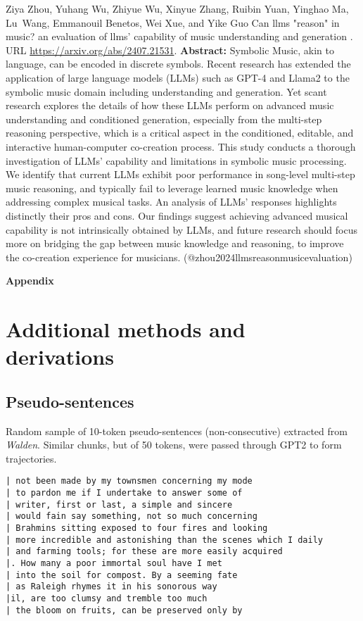 \documentclass{article} %
\begin{document}
\begin{thebibliography}{}
 Ziya Zhou, Yuhang Wu, Zhiyue Wu, Xinyue Zhang, Ruibin Yuan, Yinghao Ma, Lu~Wang, Emmanouil Benetos, Wei Xue, and Yike Guo \newblock Can llms "reason" in music? an evaluation of llms' capability of music understanding and generation . \newblock URL \url{https://arxiv.org/abs/2407.21531}. \newblock \textbf{Abstract:} Symbolic Music, akin to language, can be encoded in discrete symbols. Recent research has extended the application of large language models (LLMs) such as GPT-4 and Llama2 to the symbolic music domain including understanding and generation. Yet scant research explores the details of how these LLMs perform on advanced music understanding and conditioned generation, especially from the multi-step reasoning perspective, which is a critical aspect in the conditioned, editable, and interactive human-computer co-creation process. This study conducts a thorough investigation of LLMs' capability and limitations in symbolic music processing. We identify that current LLMs exhibit poor performance in song-level multi-step music reasoning, and typically fail to leverage learned music knowledge when addressing complex musical tasks. An analysis of LLMs' responses highlights distinctly their pros and cons. Our findings suggest achieving advanced musical capability is not intrinsically obtained by LLMs, and future research should focus more on bridging the gap between music knowledge and reasoning, to improve the co-creation experience for musicians. \newblock (@zhou2024llmsreasonmusicevaluation)
\end{thebibliography}

\clearpage

\appendix
\textbf{\LARGE Appendix}

\section{Additional methods and derivations}

\subsection{Pseudo-sentences}
\label{app:pseudosentences}
Random sample of 10-token pseudo-sentences (non-consecutive) extracted from \textit{Walden}.
Similar chunks, but of 50 tokens, were passed through GPT2 to form trajectories.
\begin{verbatim}
| not been made by my townsmen concerning my mode
| to pardon me if I undertake to answer some of
| writer, first or last, a simple and sincere
| would fain say something, not so much concerning
| Brahmins sitting exposed to four fires and looking
| more incredible and astonishing than the scenes which I daily
| and farming tools; for these are more easily acquired
|. How many a poor immortal soul have I met
| into the soil for compost. By a seeming fate
| as Raleigh rhymes it in his sonorous way
|il, are too clumsy and tremble too much
| the bloom on fruits, can be preserved only by
\end{verbatim}
\end{document}
